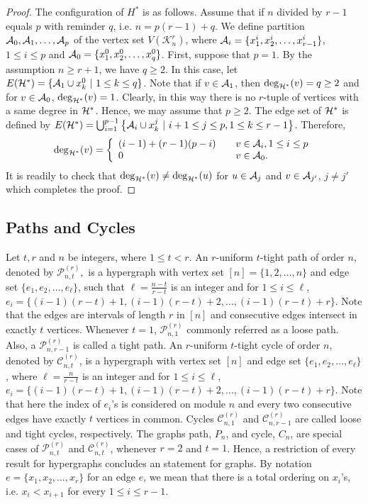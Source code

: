 \documentclass[12pt,a4paper]{article}
\begin{document}
\begin{proof}
	The configuration of $ H^* $ is as follows. Assume that if $ n $ divided by $ r-1 $ equals $ p $ with reminder $ q $, i.e.  $ n=p(r-1)+q $. We define partition $ {\cal A}_0, {\cal A}_1, \ldots, {\cal A}_p $ of the vertex set $ V({\mathcal{K}_n^r}) $, where
	$ {\cal A}_i=\{x_1^i,x_2^i,\ldots, x_{r-1}^i\} $, $ 1\leq i\leq p $ and $ {\cal A}_0=\{x_1^0,x_2^0,\ldots, x_{q}^0\} $.
	First, suppose that $ p=1 $. By the assumption $ n\geq r+1 $, we have $ q\geq 2 $. In this case, let
	$ E({\cal H}^*)=\{{\cal A}_1\cup{x_k^0} \ | \ 1\leq k\leq q\} $. Note that if $ v\in {\cal A}_1 $, then $ \deg_{{\cal H}^*}(v)=q\geq 2 $ and for $ v\in {\cal A}_0 $, $ \deg_{{\cal H}^*}(v)=1 $. Clearly, in this way there is no $ r $-tuple of vertices with a same degree in $ {\cal H}^* $.
	Hence, we may assume that $ p\geq2 $. The edge set of $ {\cal H}^* $ is defined by $ E({\cal H}^*)=\bigcup_{i=1}^{p-1}\big\{{\cal A}_i\cup{x_k^j} \ | \ i+1\leq j\leq p, 1\leq k\leq r-1\big\}  $. Therefore,
	$$ \deg_{{\cal H}^*}(v)=
	\left\{
	\begin{array}{ll}
	(i-1)+(r-1)(p-i) & \ \ \ v\in {\cal A}_i, 1\leq i\leq p \\
	0 & \ \ \ v\in {\cal A}_0.
	\end{array}
	\right.
	$$
	It is readily to check that $ \deg_{{\cal H}^*}(v)\neq\deg_{{\cal H}^*}(u) $ for $ u\in {\cal A}_j $ and $ v\in {\cal A}_{j'} $, $ j\neq j' $ which completes the proof.
\end{proof}

\subsection{Paths and Cycles}
Let $t,r$ and $ n $ be integers, where $1\leq t <r$. An $r$-uniform $t$-tight path of order $n$, denoted by   $ \mathcal{P}_{n,t}^{(r)}, $ is a hypergraph with vertex set $[n]=\{1,2,\ldots, n\}$ and edge set $\{e_1,e_2,\ldots ,e_{\ell}\}$, such that ${\ell}=\frac{n-t}{r-t}$ is an integer and for $1\leq i\leq \ell$, $e_i=\{ (i-1)(r-t)+
1, (i - 1)(r - t) + 2, \dots , (i - 1)(r - t) + r\}$. Note that the edges are intervals
of length $r$ in $[n]$ and consecutive edges intersect in exactly $t$ vertices. Whenever $t=1$,  $ \mathcal{P}_{n,1}^{(r)} $
commonly referred as a loose path. Also, a $ \mathcal{P}_{n,r-1}^{(r)} $  is called a tight path.
An $r$-uniform $t$-tight cycle of order $n$, denoted by   $ \mathcal{C}_{n,t}^{(r)} $, is a hypergraph with vertex set $[n]$ and edge set $\{e_1,e_2,\ldots ,e_{\ell}\}$, where ${\ell}=\frac{n}{r-t}$ is an integer and for $1\leq i\leq \ell$, $e_i =\{ (i-1)(r-t)+
1, (i - 1)(r - t) + 2, \dots , (i - 1)(r - t) + r\}$. Note that here the index of $e_i$'s is considered on module $n$ and every two consecutive edges have exactly $t$ vertices in common. Cycles $ \mathcal{C}_{n,1}^{(r)} $ and  $ \mathcal{C}_{n,r-1}^{(r)} $  are called  loose  and tight cycles, respectively. The graphs path, $P_n$, and cycle, $C_n$,  are special cases of $ \mathcal{P}_{n,t}^{(r)} $ and $ \mathcal{C}_{n,t}^{(r)} $, whenever $r=2$ and $t=1$. Hence, a restriction of every result for hypergraphs concludes an statement for graphs.
By notation $e=\{x_1,x_2,\ldots, x_r\}$ for an edge $e$, we mean that there is a total ordering on  $x_i$'s, i.e.  $x_i<x_{i+1}$ for every $1\leq i \leq r-1$.
\end{document}
